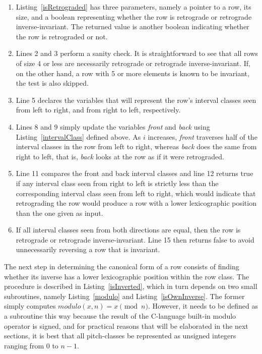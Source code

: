 \begin{enumerate}
\item Listing~\ref{isRetrograded} has three parameters, namely a pointer to a row, its size, and a boolean representing whether the row is retrograde or retrograde inverse-invariant. The returned value is another boolean indicating whether the row is retrograded or not.
\item Lines 2 and 3 perform a sanity check. It is straightforward to see that all rows of size 4 or less are necessarily retrograde or retrograde inverse-invariant. If, on the other hand, a row with 5 or more elements is known to be invariant, the test is also skipped.
\addtocounter{enumi}{2}
\item Line 5 declares the variables that will represent the row's interval classes seen from left to right, and from right to left, respectively.
\addtocounter{enumi}{2}
\item Lines 8 and 9 simply update the variables \emph{front} and \emph{back} using Listing~\ref{intervalClass} defined above. As $i$ increases, \emph{front} traverses half of the interval classes in the row from left to right, whereas \emph{back} does the same from right to left, that is, \emph{back} looks at the row as if it were retrograded.
\addtocounter{enumi}{2}
\item Line 11 compares the front and back interval classes and line 12 returns true if any interval class seen from right to left is strictly less than the corresponding interval class seen from left to right, which would indicate that retrograding the row would produce a row with a lower lexicographic position than the one given as input.
\addtocounter{enumi}{3}
\item If all interval classes seen from both directions are equal, then the row is retrograde or retrograde inverse-invariant. Line 15 then returns false to avoid unnecessarily reversing a row that is invariant.
\end{enumerate}

The next step in determining the canonical form of a row consists of finding whether its inverse has a lower lexicographic position within the row class. The procedure is described in Listing~\ref{isInverted}, which in turn depends on two small subroutines, namely Listing~\ref{modulo} and Listing~\ref{isOwnInverse}. The former simply computes $modulo(x, n) = x \pmod{n}$. However, it needs to be defined as a subroutine this way because the result of the C-language built-in modulo operator is signed, and for practical reasons that will be elaborated in the next sections, it is best that all pitch-classes be represented as unsigned integers ranging from $0$ to $n - 1$.

